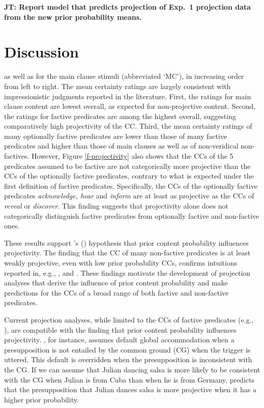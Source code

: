 \documentclass[11pt,fleqn]{article}
\newcommand{\6}{\mbox{$[\hspace*{-.6mm}[$}}
\newcommand{\9}{\mbox{$]\hspace*{-.6mm}]$}}
\newcommand{\citetpos}[1]{\citeauthor{#1}'s (\citeyear{#1})}
\newcommand{\jt}[1]{\textbf{\color{blue}JT: #1}}
\begin{document}
\jt{Report model that predicts projection of Exp.~1 projection data from the new prior probability means.}


\section{Discussion}\label{s4}


as well as for the main clause stimuli (abbreviated `MC'), in increasing order from left to right. The mean certainty ratings are largely consistent with impressionistic judgments reported in the literature. First, the ratings for main clause content are lowest overall, as expected for non-projective content. Second, the ratings for factive predicates are among the highest overall, suggesting comparatively high projectivity of the CC. Third, the mean certainty ratings of many optionally factive predicates are lower than those of many factive predicates and higher than those of main clauses as well as of non-veridical non-factives. However, Figure \ref{f-projectivity} also shows that the CCs of the 5 predicates assumed to be factive are not categorically more projective than the CCs of the optionally factive predicates, contrary to what is expected under the first definition of factive predicates. Specifically, the CCs of the optionally factive predicates {\em acknowledge, hear} and {\em inform} are at least as projective as the CCs of {\em reveal} or {\em discover}. This finding suggests that projectivity alone does not categorically distinguish factive predicates from optionally factive and non-factive ones.


These results support \citetpos{tbd-variability} hypothesis that prior content probability influences projectivity. The finding that the CC of many non-factive predicates is at least weakly projective, even with low prior probability CCs, confirms intuitions reported in, e.g., \citealt{schlenker10}, \citealt{anand-hacquard2014} and \citealt{spector-egre2015}. These findings motivate the development of projection analyses that derive the influence of prior content probability and make predictions for the CCs of a broad range of both factive and non-factive predicates.

Current projection analyses, while limited to the CCs of factive predicates (e.g., \citealt{heim83,vds92,abrusan2011,brst-salt10,brst-ar}), are compatible with the finding that prior content probability influences projectivity. \citealt{heim83}, for instance, assumes default global accommodation when a presupposition is not entailed by the common ground (CG) when the trigger is uttered. This default is overridden when the presupposition is inconsistent with the CG. If we can assume that Julian dancing salsa is more likely to be consistent with the CG when Julian is from Cuba than when he is from Germany, \citealt{heim83} predicts that the presupposition that Julian dances salsa is more projective when it has a higher prior probability. 
\end{document}
